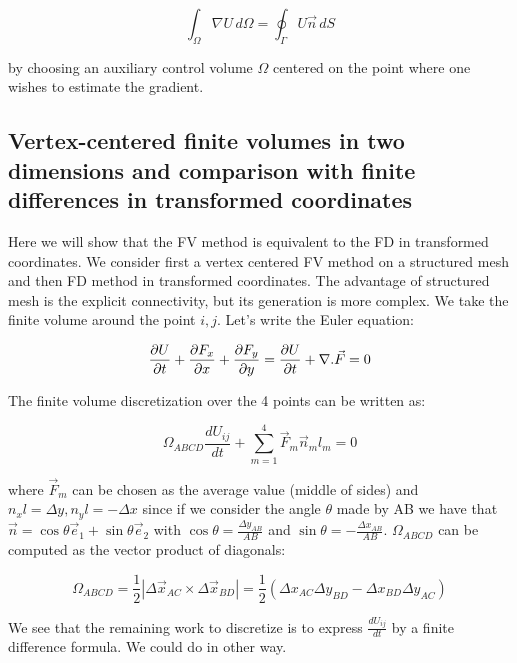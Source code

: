 \begin{equation}
\int _\Omega \nabla U \, d\Omega = \oint _\Gamma U\vec{n}\, dS
\end{equation}

by choosing an auxiliary control volume $\Omega$ centered on the point where one wishes to estimate the gradient. 

\subsection{Vertex-centered finite volumes in two dimensions and comparison with finite differences in transformed coordinates}
Here we will show that the FV method is equivalent to the FD in transformed coordinates. We consider first a vertex centered FV method on a structured mesh and then FD method in transformed coordinates. The advantage of structured mesh is the explicit connectivity, but its generation is more complex. We take the finite volume around the point $i, j$. Let's write the Euler equation: 

\begin{equation}
\frac{\partial U}{\partial t} +\frac{\partial F_x}{\partial x} + \frac{\partial F_y}{\partial y} = \frac{\partial U}{\partial t } + \nabla .\vec{F} = 0
\end{equation}

The finite volume discretization over the 4 points can be written as: 

\begin{equation}
\Omega _{ABCD} \frac{dU_{ij}}{dt} + \sum_{m=1}^{4} \vec{F}_m\vec{n}_ml_m=0
\end{equation} 

where $\vec{F}_m$ can be chosen as the average value (middle of sides) and $n_x l = \Delta y, n_y l =  - \Delta x$ since if we consider the angle $\theta$ made by AB we have that $\vec{n} = \cos \theta \vec{e}_1 + \sin \theta \vec{e}_2$ with $\cos \theta = \frac{\Delta y_{AB}}{AB}$ and $\sin \theta = -\frac{\Delta x_{AB}}{AB}$. $\Omega _{ABCD}$ can be computed as the vector product of diagonals: 

\begin{equation}
\Omega _{ABCD} = \frac{1}{2}|\Delta \vec{x} _{AC} \times \Delta \vec{x}_{BD}| = \frac{1}{2} (\Delta x_{AC}\Delta y_{BD}-\Delta x_{BD}\Delta y_{AC})
\end{equation}

We see that the remaining work to discretize is to express $\frac{dU_{ij}}{dt}$ by a finite difference formula. We could do in other way. \\

